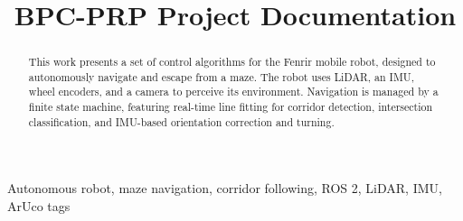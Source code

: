 \documentclass[conference]{IEEEtran}
\begin{document}
\title{BPC-PRP Project Documentation}

\author{
\and
{}
}


\maketitle

\begin{abstract}
This work presents a set of control algorithms for the Fenrir mobile robot, designed to autonomously navigate and escape from a maze. The robot uses LiDAR, an IMU, wheel encoders, and a camera to perceive its environment. Navigation is managed by a finite state machine, featuring real-time line fitting for corridor detection, intersection classification, and IMU-based orientation correction and turning.
\end{abstract}

\begin{IEEEkeywords}
Autonomous robot, maze navigation, corridor following, ROS 2, LiDAR, IMU, ArUco tags
\end{IEEEkeywords}






\printbibliography


\end{document}

